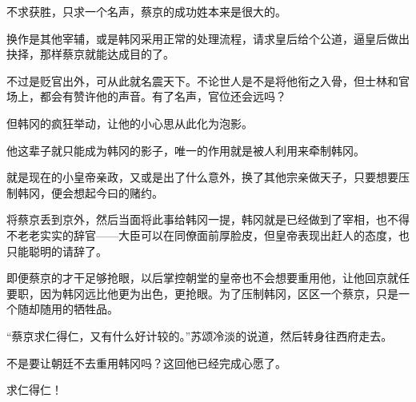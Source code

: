 不求获胜，只求一个名声，蔡京的成功姓本来是很大的。

换作是其他宰辅，或是韩冈采用正常的处理流程，请求皇后给个公道，逼皇后做出抉择，那样蔡京就能达成目的了。

不过是贬官出外，可从此就名震天下。不论世人是不是将他衔之入骨，但士林和官场上，都会有赞许他的声音。有了名声，官位还会远吗？

但韩冈的疯狂举动，让他的小心思从此化为泡影。

他这辈子就只能成为韩冈的影子，唯一的作用就是被人利用来牵制韩冈。

就是现在的小皇帝亲政，又或是出了什么意外，换了其他宗亲做天子，只要想要压制韩冈，便会想起今曰的赌约。

将蔡京丢到京外，然后当面将此事给韩冈一提，韩冈就是已经做到了宰相，也不得不老老实实的辞官——大臣可以在同僚面前厚脸皮，但皇帝表现出赶人的态度，也只能聪明的请辞了。

即便蔡京的才干足够抢眼，以后掌控朝堂的皇帝也不会想要重用他，让他回京就任要职，因为韩冈远比他更为出色，更抢眼。为了压制韩冈，区区一个蔡京，只是一个随却随用的牺牲品。

“蔡京求仁得仁，又有什么好计较的。”苏颂冷淡的说道，然后转身往西府走去。

不是要让朝廷不去重用韩冈吗？这回他已经完成心愿了。

求仁得仁！
